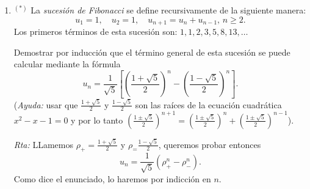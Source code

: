 \documentclass[a4paper,12pt,twoside,spanish,reqno]{amsbook}
\numberwithin{equation}{section}
\newcommand{\rta}{\noindent\textit{Rta: }}
\begin{document}
\begin{enumerate}[resume]
\begin{enumerate}
                \rta El caso base es par $n=1$ y en ese caso $5\cdot 1+3=8$ que no es divisible por 5. Por lo tanto al fallar el caso base no es posible hacer la demostración por inducción. 
                
                
                
                \item Sea $a\in\mathbb R$, con $a\neq 0$. Vamos a demostrar que para todo entero no negativo $n$, $a^n=1$.
                
                Como $a^0=1$ por definición, la proposición es verdadera para $n=0$. Supongamos
                que para  un entero $k$, $a^m=1$ para $0\leq m \leq k$. Entonces
                $a^{k+1}= \frac{a^k a^k}{a^{k-1}}=\frac{1\cdot1}1=1$.
                Por lo tanto, el principio de inducción fuerte implica que $a^n=1$ para todo $n\in \mathbb N$.
                
                \rta En  este caso falla el paso inductivo para $k=0$,  en este caso el razonamiento es
                \begin{equation*}
                    a^{1}= \frac{a^0 a^0}{a^{-1}}=\frac{1\cdot1}1=1
                \end{equation*}
                Pero la última igualdad es incorrecta, pues nada demuestra que $a^{-1}$  se igual a $1$ y, en efecto, no lo es salvo que  $a=1$. 
            \end{enumerate}
            
             \item${}^{(*)}$ La \emph{sucesión de Fibonacci} se define recursivamente de la siguiente manera:
            $$
            u_1=1,\quad u_2=1,\quad u_{n+1}=u_{n}+u_{n-1}, \, n\geq 2.
            $$
            Los primeros términos de esta sucesión son: $1,1,2,3,5,8,13,\ldots$
            
            Demostrar por inducción que el término general de esta sucesión se puede calcular mediante la fórmula
            $$
            u_n= \frac{1}{\sqrt{5}}\left[\left(\frac{1+\sqrt{5}}{2}\right)^n-\left(\frac{1-\sqrt{5}}{2}\right)^n\right].
            $$
            (\textit{Ayuda:} usar que $\frac{1+\sqrt{5}}{2}$ y $\frac{1-\sqrt{5}}{2}$ son las raíces de la ecuación cuadrática $x^2-x-1=0$ y por lo tanto  $\left(\frac{1\pm\sqrt{5}}{2}\right)^{n+1} = \left(\frac{1\pm\sqrt{5}}{2}\right)^{n}+\left(\frac{1\pm\sqrt{5}}{2}\right)^{n-1}$).
            
            \rta LLamemos $\rho_+ = \frac{1+\sqrt{5}}{2}$ y $\rho_ = \frac{1-\sqrt{5}}{2}$,  queremos probar entonces
            \begin{equation}
                u_n= \frac{1}{\sqrt{5}}(\rho_+^n - \rho_-^n). \tag{$P_n$}
            \end{equation}
            Como dice el enunciado, lo haremos por indicción en $n$.
            

\end{enumerate}
\end{document}
